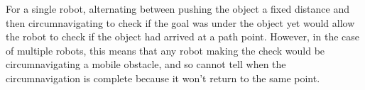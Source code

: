 For a single robot, alternating between pushing the object a fixed distance and then circumnavigating to check if the goal was under the object yet would allow the robot to check if the object had arrived at a path point. However, in the case of multiple robots, this means that any robot making the check would be circumnavigating a mobile obstacle, and so cannot tell when the circumnavigation is complete because it won't return to the same point. 

%
%
%
%
%
%
%
%
%
%
